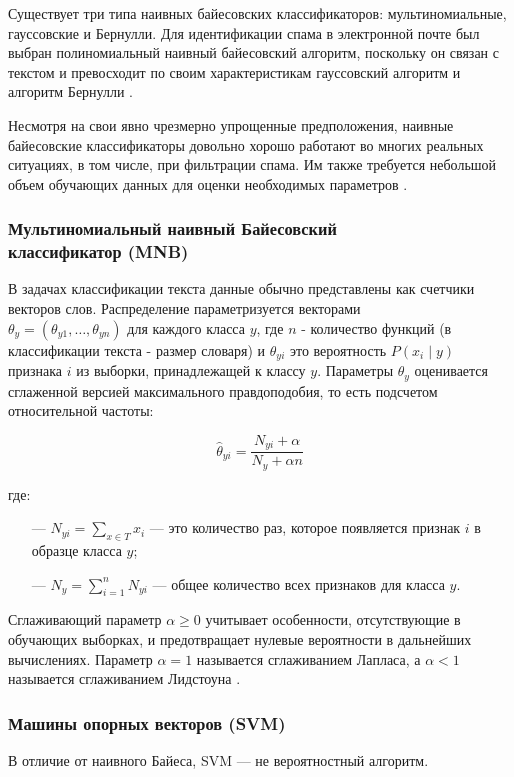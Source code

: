 Существует три типа наивных байесовских классификаторов: мультиномиальные,
гауссовские и Бернулли. Для идентификации спама в электронной почте
был выбран полиномиальный наивный байесовский алгоритм, поскольку он
связан с текстом и превосходит по своим характеристикам гауссовский
алгоритм и алгоритм Бернулли \cite{IEEE}.

Несмотря на свои явно чрезмерно упрощенные предположения,
наивные байесовские классификаторы довольно хорошо работают
во многих реальных ситуациях, в том числе, при фильтрации
спама. Им также требуется небольшой объем обучающих
данных для оценки необходимых параметров \cite{scikitMNB}.

\subsubsection{Мультиномиальный наивный Байесовский \\ классификатор (MNB)}
В задачах классификации текста данные обычно представлены как счетчики векторов слов.
Распределение параметризуется векторами \\ $\theta_y = (\theta_{y1},\ldots,\theta_{yn})$
для каждого класса ${y}$, где ${n}$ - количество функций (в
классификации текста - размер словаря) и $\theta_{yi}$ это вероятность
$P(x_i \mid y)$ признака ${i}$ из выборки, принадлежащей к классу ${y}$.
Параметры $\theta_y$ оценивается сглаженной версией максимального правдоподобия,
то есть подсчетом относительной частоты:

\begin{equation}\label{eq4}
    \hat{\theta}_{yi} = \frac{ N_{yi} + \alpha}{N_y + \alpha n}
\end{equation}

где:
\begin{itemize}
    \item[—] $N_{yi} = \sum_{x \in T} x_i$ — это количество раз,
        которое появляется признак ${i}$ в образце класса ${y}$;
    \item[—] $N_{y} = \sum_{i=1}^{n} N_{yi}$ — общее количество всех признаков для класса ${y}$.
\end{itemize}

Сглаживающий параметр $\alpha \ge 0$ учитывает особенности, отсутствующие
в обучающих выборках, и предотвращает нулевые вероятности в дальнейших
вычислениях. Параметр $\alpha = 1$ называется сглаживанием Лапласа, а $\alpha < 1$
называется сглаживанием Лидстоуна \cite{scikitMNB}.

\subsubsection{Машины опорных векторов (SVM)}
В отличие от наивного Байеса, SVM — не вероятностный алгоритм.

